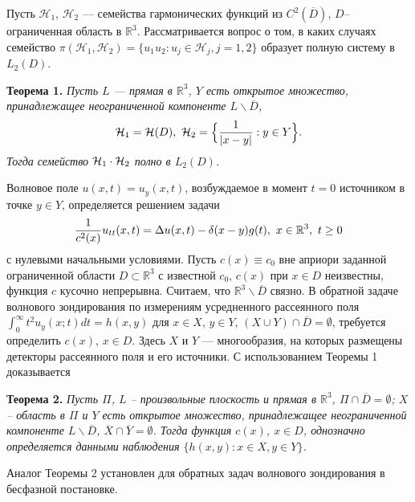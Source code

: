 
\vzmscaption
Пусть ${\mathcal H}_1$, ${\mathcal H}_2$ --- семейства гармонических функций из $C^2({\overline D})$, $D$--ограниченная область в $\mathbb{R}^3$.
Рассматривается вопрос о том, в каких случаях семейство $\pi({\mathcal H}_1,{\mathcal H}_2)=\{ u_1 u_2: u_j \in {\mathcal H}_j, j=1,2 \}$
образует полную систему в $L_2(D)$.

{\bf Теорема 1.} {\it Пусть $L$ --- прямая в $\mathbb{R}^3$, $Y$ есть открытое множество, принадлежащее неограниченной компоненте $L\backslash {\overline D}$,
$$
{\cal H}_1={\cal H}(D), \,\, {\cal H}_2=\Bigl\{ {{1}\over{\vert x-y\vert}}: y\in Y \Bigr\}.
$$
Тогда семейство ${\cal H}_1 \cdot {\cal H}_2$ полно в $L_{2}(D)$.
}


Волновое поле $u(x,t)=u_y(x,t)$, возбуждаемое в момент $t=0$ источником в точке $y\in Y$, определяется решением задачи
$$
{{1}\over{c^2(x)}} u_{tt}(x,t)=\Delta
u(x,t)-\delta(x-y) g(t), \,\, x\in \mathbb{R}^3, \,\, t\geq 0
$$
с нулевыми начальными условиями. Пусть $c(x)\equiv c_0$ вне априори заданной ограниченной области $D \subset \mathbb{R}^3$ с известной $c_0$, $c(x)$ при $x\in D$ неизвестны, функция $c$ кусочно непрерывна. Считаем, что ${\mathbb R}^3 \backslash {\overline D}$ связно.
В обратной задаче волнового зондирования по измерениям усредненного рассеянного поля $\int_0^{\infty} t^2 u_y(x;t)dt=h(x,y)$ для $x\in X$, $y\in Y$, $(X\cup Y)\cap {\overline D}=\emptyset$, требуется определить $c(x)$, $x\in D$. Здесь $X$ и $Y$ --- многообразия, на которых размещены детекторы рассеянного поля и его источники. С использованием Теоремы 1 доказывается

{\bf Теорема 2.} {\it Пусть $\Pi$, ${L}$ -- произвольные плоскость и прямая в $\mathbb{R}^3$, $\Pi\cap {\overline D}=\emptyset$; $X$ -- область в $\Pi$ и $Y$ есть открытое множество, принадлежащее неограниченной компоненте $L\backslash {\overline D}$, ${\overline X} \cap {\overline Y}=\emptyset$. Тогда функция $c(x)$, $x\in D$, однозначно определяется данными наблюдения $\{ h(x,y): x\in X, y\in Y \}$.
}

Аналог Теоремы 2 установлен для обратных задач волнового зондирования в бесфазной постановке.
